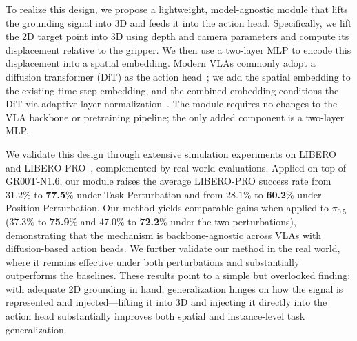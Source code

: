 To realize this design, we propose a lightweight, model-agnostic module that lifts the grounding signal into 3D and feeds it into the action head. Specifically, we lift the 2D target point into 3D using depth and camera parameters and compute its displacement relative to the gripper. We then use a two-layer MLP to encode this displacement into a spatial embedding. Modern VLAs commonly adopt a diffusion transformer (DiT) as the action head~\cite{li2024cogact, pi0, pi05, gr00tn1_2025, molmobot}; we add the spatial embedding to the existing time-step embedding, and the combined embedding conditions the DiT via adaptive layer normalization~\cite{DiT, perez2018film}. The module requires no changes to the VLA backbone or pretraining pipeline; the only added component is a two-layer MLP.

We validate this design through extensive simulation experiments on LIBERO~\cite{libero} and LIBERO-PRO~\cite{zhou2025liberopro}, complemented by real-world evaluations. Applied on top of GR00T-N1.6, our module raises the average LIBERO-PRO success rate from $31.2\%$ to \textbf{77.5}$\%$ under Task Perturbation and from $28.1\%$ to \textbf{60.2}$\%$ under Position Perturbation. Our method yields comparable gains when applied to $\pi_{0.5}$ ($37.3\%$ to \textbf{75.9}$\%$ and $47.0\%$ to \textbf{72.2}$\%$ under the two perturbations), demonstrating that the mechanism is backbone-agnostic across VLAs with diffusion-based action heads. 
We further validate our method in the real world, where it remains effective under both perturbations and substantially outperforms the baselines.
These results point to a simple but overlooked finding: with adequate 2D grounding in hand, generalization hinges on how the signal is represented and injected—lifting it into 3D and injecting it directly into the action head substantially improves both spatial and instance-level task generalization.